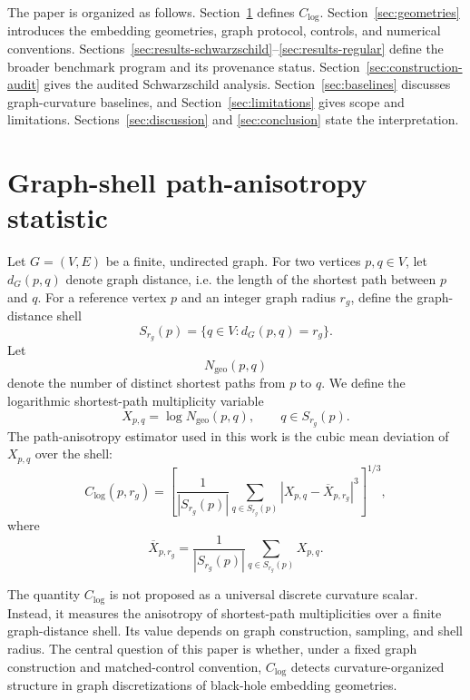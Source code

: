 \documentclass[11pt,a4paper]{article}
\begin{document}
The paper is organized as follows. Section~\ref{sec:estimator} defines $C_{\log}$. Section~\ref{sec:geometries} introduces the embedding geometries, graph protocol, controls, and numerical conventions. Sections~\ref{sec:results-schwarzschild}--\ref{sec:results-regular} define the broader benchmark program and its provenance status. Section~\ref{sec:construction-audit} gives the audited Schwarzschild analysis. Section~\ref{sec:baselines} discusses graph-curvature baselines, and Section~\ref{sec:limitations} gives scope and limitations. Sections~\ref{sec:discussion} and \ref{sec:conclusion} state the interpretation.

\section{Graph-shell path-anisotropy statistic}
\label{sec:estimator}

Let $G=(V,E)$ be a finite, undirected graph. For two vertices $p,q\in V$, let $d_G(p,q)$ denote graph distance, i.e. the length of the shortest path between $p$ and $q$. For a reference vertex $p$ and an integer graph radius $r_g$, define the graph-distance shell
\begin{equation}
    S_{r_g}(p)
    =
    \{q\in V : d_G(p,q)=r_g\}.
\end{equation}
Let
\begin{equation}
    N_{\mathrm{geo}}(p,q)
\end{equation}
denote the number of distinct shortest paths from $p$ to $q$. We define the logarithmic shortest-path multiplicity variable
\begin{equation}
    X_{p,q}
    =
    \log N_{\mathrm{geo}}(p,q),
    \qquad q\in S_{r_g}(p).
\end{equation}
The path-anisotropy estimator used in this work is the cubic mean deviation of $X_{p,q}$ over the shell:
\begin{equation}
    C_{\log}(p,r_g)
    =
    \left[
    \frac{1}{|S_{r_g}(p)|}
    \sum_{q\in S_{r_g}(p)}
    \left|
    X_{p,q}
    -
    \overline{X}_{p,r_g}
    \right|^3
    \right]^{1/3},
    \label{eq:clog}
\end{equation}
where
\begin{equation}
    \overline{X}_{p,r_g}
    =
    \frac{1}{|S_{r_g}(p)|}
    \sum_{q\in S_{r_g}(p)}
    X_{p,q}.
\end{equation}

The quantity $C_{\log}$ is not proposed as a universal discrete curvature scalar. Instead, it measures the anisotropy of shortest-path multiplicities over a finite graph-distance shell. Its value depends on graph construction, sampling, and shell radius. The central question of this paper is whether, under a fixed graph construction and matched-control convention, $C_{\log}$ detects curvature-organized structure in graph discretizations of black-hole embedding geometries.
\end{document}
